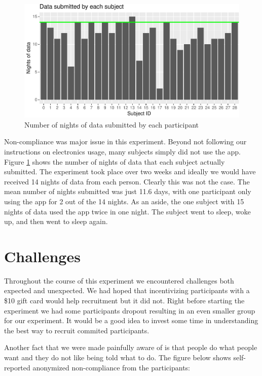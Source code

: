 \documentclass[12pt,]{article}
\begin{document}
\begin{figure}
\centering
\includegraphics{report_files/figure-latex/days_used-1.pdf}
\caption{\label{fig:days_used} Number of nights of data submitted by
each participant}
\end{figure}

Non-compliance was major issue in this experiment. Beyond not following
our instructions on electronics usage, many subjects simply did not use
the app. Figure \ref{fig:days_used} shows the number of nights of data
that each subject actually submitted. The experiment took place over two
weeks and ideally we would have received 14 nights of data from each
person. Clearly this was not the case. The mean number of nights
submitted was just 11.6 days, with one participant only using the app
for 2 out of the 14 nights. As an aside, the one subject with 15 nights
of data used the app twice in one night. The subject went to sleep, woke
up, and then went to sleep again.

\section{Challenges}\label{challenges}

Throughout the course of this experiment we encountered challenges both
expected and unexpected. We had hoped that incentivizing participants
with a \$10 gift card would help recruitment but it did not. Right
before starting the experiment we had some participants dropout
resulting in an even smaller group for our experiment. It would be a
good idea to invest some time in understanding the best way to recruit
commited participants.

Another fact that we were made painfully aware of is that people do what
people want and they do not like being told what to do. The figure below
shows self-reported anonymized non-compliance from the participants:
\end{document}
